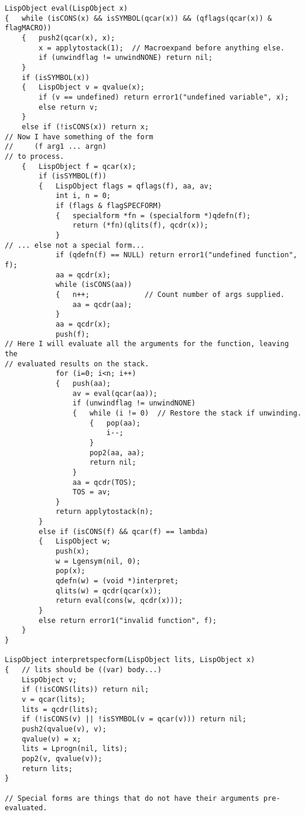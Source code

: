 {\begin{verbatim}
LispObject eval(LispObject x)
{   while (isCONS(x) && isSYMBOL(qcar(x)) && (qflags(qcar(x)) & flagMACRO))
    {   push2(qcar(x), x);
        x = applytostack(1);  // Macroexpand before anything else.
        if (unwindflag != unwindNONE) return nil;
    }
    if (isSYMBOL(x))
    {   LispObject v = qvalue(x);
        if (v == undefined) return error1("undefined variable", x);
        else return v;
    }
    else if (!isCONS(x)) return x;
// Now I have something of the form
//     (f arg1 ... argn)
// to process.
    {   LispObject f = qcar(x);
        if (isSYMBOL(f))
        {   LispObject flags = qflags(f), aa, av;
            int i, n = 0;
            if (flags & flagSPECFORM)
            {   specialform *fn = (specialform *)qdefn(f);
                return (*fn)(qlits(f), qcdr(x));
            }
// ... else not a special form...
            if (qdefn(f) == NULL) return error1("undefined function", f);
            aa = qcdr(x);
            while (isCONS(aa))
            {   n++;             // Count number of args supplied.
                aa = qcdr(aa);
            }
            aa = qcdr(x);
            push(f);
// Here I will evaluate all the arguments for the function, leaving the
// evaluated results on the stack.
            for (i=0; i<n; i++)
            {   push(aa);
                av = eval(qcar(aa));
                if (unwindflag != unwindNONE)
                {   while (i != 0)  // Restore the stack if unwinding.
                    {   pop(aa);
                        i--;
                    }
                    pop2(aa, aa);
                    return nil;
                }
                aa = qcdr(TOS);
                TOS = av;
            }
            return applytostack(n);
        }
        else if (isCONS(f) && qcar(f) == lambda)
        {   LispObject w;
            push(x);
            w = Lgensym(nil, 0);
            pop(x);
            qdefn(w) = (void *)interpret;
            qlits(w) = qcdr(qcar(x));
            return eval(cons(w, qcdr(x)));
        }
        else return error1("invalid function", f);
    }
}

LispObject interpretspecform(LispObject lits, LispObject x)
{   // lits should be ((var) body...)
    LispObject v;
    if (!isCONS(lits)) return nil;
    v = qcar(lits);
    lits = qcdr(lits);
    if (!isCONS(v) || !isSYMBOL(v = qcar(v))) return nil;
    push2(qvalue(v), v);
    qvalue(v) = x;
    lits = Lprogn(nil, lits);
    pop2(v, qvalue(v));
    return lits;
}

// Special forms are things that do not have their arguments pre-evaluated.


\end{verbatim}}
